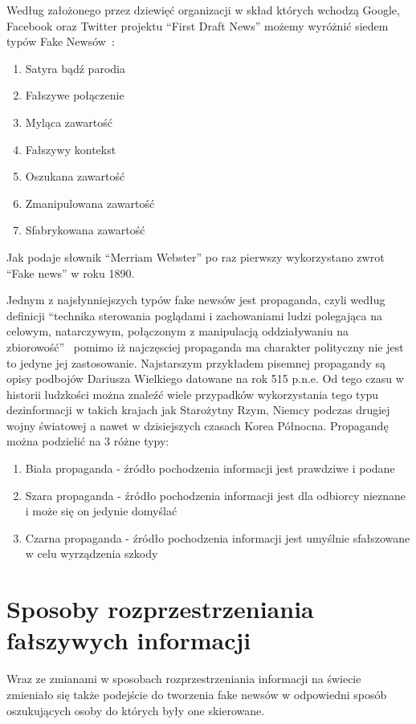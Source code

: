 Według założonego przez dziewięć organizacji w skład których wchodzą 
Google, Facebook oraz Twitter projektu ``First Draft News''
możemy wyróżnić siedem typów Fake Newsów~\cite{TypesOfFakeNews}:
\begin{enumerate}
    \item Satyra bądź parodia
    \item Fałszywe połączenie
    \item Myląca zawartość
    \item Fałszywy kontekst
    \item Oszukana zawartość
    \item Zmanipulowana zawartość
    \item Sfabrykowana zawartość
\end{enumerate}
Jak podaje słownik ``Merriam Webster'' po raz pierwszy wykorzystano zwrot
``Fake news'' w roku 1890.


Jednym z najsłynniejszych typów fake newsów jest propaganda, czyli według 
definicji ``technika sterowania poglądami i zachowaniami ludzi polegająca na 
celowym, natarczywym, połączonym z manipulacją oddziaływaniu na zbiorowość''~\cite{SJP}
pomimo iż najczęsciej propaganda ma charakter polityczny nie jest to jedyne 
jej zastosowanie. Najstarszym przykładem pisemnej propagandy są opisy podbojów
Dariusza Wielkiego datowane na rok 515 p.n.e. Od tego czasu w historii ludzkości
można znaleźć wiele przypadków wykorzystania tego typu dezinformacji w takich krajach
jak Starożytny Rzym, Niemcy podczas drugiej wojny światowej a nawet w dzisiejszych 
czasach Korea Północna.
Propagandę można podzielić na 3 różne typy:
\begin{enumerate}
    \item Biała propaganda - źródło pochodzenia informacji jest prawdziwe i podane
    \item Szara propaganda - źródło pochodzenia informacji jest dla odbiorcy nieznane i może się on jedynie domyślać
    \item Czarna propaganda - źródło pochodzenia informacji jest umyślnie sfałszowane w celu wyrządzenia szkody 
\end{enumerate}


\section{Sposoby rozprzestrzeniania fałszywych informacji}
Wraz ze zmianami w sposobach rozprzestrzeniania informacji na świecie zmieniało się
także podejście do tworzenia fake newsów w odpowiedni sposób oszukujących osoby do których 
były one skierowane. 

